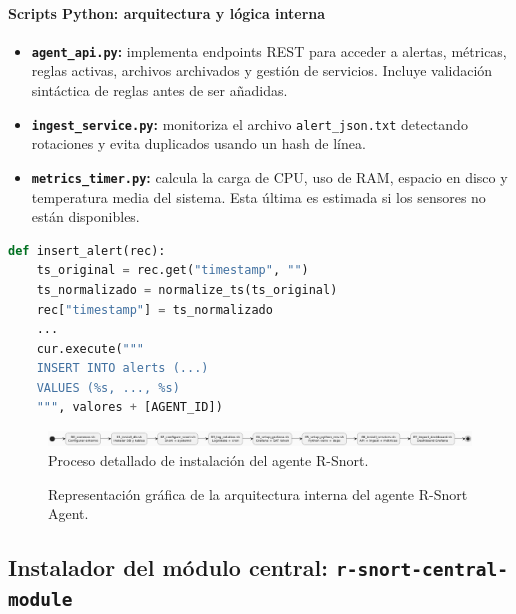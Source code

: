 \documentclass[11pt,a4paper,twoside]{report}
\begin{document}
\paragraph{Scripts Python: arquitectura y lógica interna}

\begin{itemize}
	\item \textbf{\texttt{agent\_api.py}:} implementa endpoints REST para acceder a alertas, métricas, reglas activas, archivos archivados y gestión de servicios. Incluye validación sintáctica de reglas antes de ser añadidas.
	\item \textbf{\texttt{ingest\_service.py}:} monitoriza el archivo \texttt{alert\_json.txt} detectando rotaciones y evita duplicados usando un hash de línea.
	\item \textbf{\texttt{metrics\_timer.py}:} calcula la carga de CPU, uso de RAM, espacio en disco y temperatura media del sistema. Esta última es estimada si los sensores no están disponibles.
\end{itemize}

\begin{lstlisting}[language=Python, caption={Fragmento de inserción de alerta en ingest\_service.py}]
	def insert_alert(rec):
	ts_original = rec.get("timestamp", "")
	ts_normalizado = normalize_ts(ts_original)
	rec["timestamp"] = ts_normalizado
	...
	cur.execute("""
	INSERT INTO alerts (...)
	VALUES (%s, ..., %s)
	""", valores + [AGENT_ID])
\end{lstlisting}

\begin{figure}[ht]
	\centering
	 \includegraphics[width=1\textwidth]{documento/14.png}
	\caption{Proceso detallado de instalación del agente R-Snort.}
	\label{fig:bpmn-snort-agent}
\end{figure}

\begin{figure}[ht]
	\centering
	\caption{Representación gráfica de la arquitectura interna del agente R-Snort Agent.}
	\label{fig:arquitectura-snort-agent}
\end{figure}


\subsection{Instalador del módulo central: \texttt{r-snort-central-module}}
\end{document}
